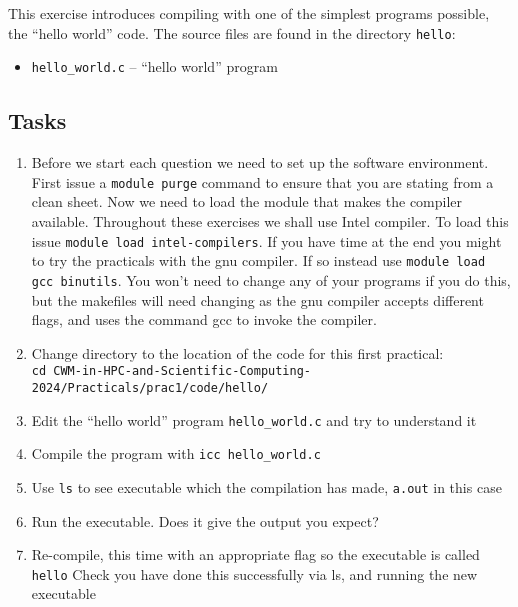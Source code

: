 \documentclass[a4paper, 12pt]{article}
\def \cc   {\tt }               %
\begin{document}
This exercise introduces compiling with
one of the simplest programs possible, the ``hello world'' code.  The source
files are found in the directory {\cc hello}:
%
\begin{itemize}
  \item {\cc hello\_world.c} -- ``hello world'' program 
\end{itemize}
%

\subsection*{Tasks}

\begin{enumerate}

  \item Before we start each question we need to set up the software 
    environment. First issue a {\cc module purge} command to ensure
    that you are stating from a clean sheet. Now we need to load
    the module that makes the compiler available.
    Throughout these exercises we shall use Intel compiler. To load this issue 
    {\cc module load intel-compilers}. If you have time at the end
    you might to try the practicals with the gnu
    compiler. If so instead use {\cc module load gcc binutils}.
    You won't need to change any of your programs if you do this, but the
    makefiles will need changing as the gnu compiler accepts different flags, and uses
    the command gcc to invoke the compiler.
  \item Change directory to the location of the code for this ﬁrst practical:\\
{\cc cd CWM-in-HPC-and-Scientific-Computing-2024/Practicals/prac1/code/hello/}

  \item Edit the ``hello world'' program {\cc hello\_world.c} and try to understand it

  \item Compile the program with {\cc icc hello\_world.c}

  \item Use \texttt{ls} to see executable which the compilation has made, {\cc a.out} in this case

  \item Run the executable. Does it give the output you expect?

  \item Re-compile, this time with an appropriate flag so the executable is called {\cc hello}
    Check you have done this successfully via ls, and running the new executable

\end{enumerate}
\end{document}

